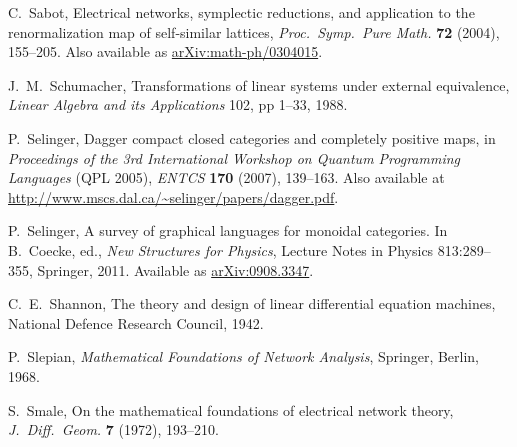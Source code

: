 \begin{thebibliography}{RSW00}
     C.\ Sabot, Electrical networks, symplectic reductions, and
    application to the renormalization map of self-similar lattices, {\sl
    Proc.\ Symp.\ Pure Math.} {\bf 72} (2004), 155--205. Also available as
    \href{http://arxiv.org/abs/math-ph/0304015}{arXiv:math-ph/0304015}.

     J.\ M.\ Schumacher, Transformations of linear systems under
    external equivalence, \emph{Linear Algebra and its Applications} 102,
    pp 1--33, 1988.


     P.\ Selinger, Dagger compact closed categories and completely
    positive maps, in {\sl Proceedings of the 3rd International Workshop on
    Quantum Programming Languages} (QPL 2005), {\sl ENTCS} {\bf 170} (2007),
    139--163.  Also available at
    \href{http://www.mscs.dal.ca/~selinger/papers/dagger.pdf}{http://www.mscs.dal.ca/\~{}selinger/papers/dagger.pdf}.

     P.\ Selinger, A survey of graphical languages
    for monoidal categories. In B.\ Coecke, ed., \emph{New Structures for
    Physics}, Lecture Notes in Physics 813:289--355, Springer, 2011. Available
    as \href{http://arxiv.org/abs/0908.3347}{arXiv:0908.3347}.

     C.\ E.\ Shannon, The theory and design of linear differential equation machines, National Defence Research Council, 1942.


     P.\ Slepian, {\sl Mathematical Foundations of Network
    Analysis}, Springer, Berlin, 1968. 

     S.\ Smale, On the mathematical foundations of electrical
    network theory, {\sl J.\ Diff.\ Geom.} {\bf 7} (1972), 193--210. 





\end{thebibliography}
